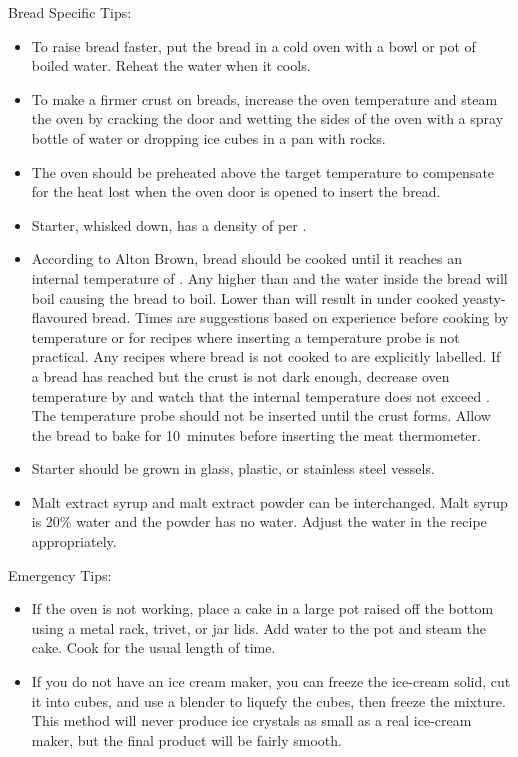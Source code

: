 \noindent Bread Specific Tips:
\begin{itemize}
\item To raise bread faster, put the bread in a cold oven with a bowl or pot of boiled water. Reheat the water when it cools.
\item To make a firmer crust on breads, increase the oven temperature and steam the oven by cracking the door and wetting the sides of the oven with a spray bottle of water or dropping ice cubes in a pan with rocks.
\item The oven should be preheated  above the target temperature to compensate for the heat lost when the oven door is opened to insert the bread.
\item Starter, whisked down, has a density of  per .
\item According to Alton Brown, bread should be cooked until it reaches an internal temperature of . Any higher than  and the water inside the bread will boil causing the bread to boil. Lower than  will result in under cooked yeasty-flavoured bread. Times are suggestions based on experience before cooking by temperature or for recipes where inserting a temperature probe is not practical. Any recipes where bread is not cooked to  are explicitly labelled. If a bread has reached  but the crust is not dark enough, decrease oven temperature by  and watch that the internal temperature does not exceed . The temperature probe should not be inserted until the crust forms. Allow the bread to bake for 10~minutes before inserting the meat thermometer.
\item Starter should be grown in glass, plastic, or stainless steel vessels.
\item Malt extract syrup and malt extract powder can be interchanged. Malt syrup is 20\% water and the powder has no water. Adjust the water in the recipe appropriately.
\end{itemize}

\noindent Emergency Tips:
\begin{itemize}
\item If the oven is not working, place a cake in a large pot raised off the bottom using a metal rack, trivet, or jar lids. Add water to the pot and steam the cake. Cook for the usual length of time.
\item If you do not have an ice cream maker, you can freeze the ice-cream solid, cut it into cubes, and use a blender to liquefy the cubes, then freeze the mixture. This method will never produce ice crystals as small as a real ice-cream maker, but the final product will be fairly smooth.
\end{itemize}

